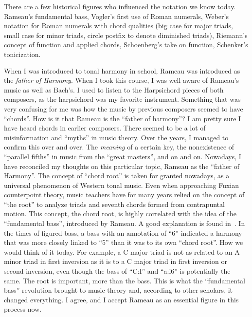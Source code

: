 There are a few historical figures who influenced the notation we know today.
Rameau's fundamental bass, Vogler's first use of Roman numerals, Weber's notation for Roman numerals with chord qualities (big case for major triads, small case for minor triads, circle postfix to denote diminished triads), Riemann's concept of function and applied chords, Schoenberg's take on function, Schenker's tonicization.

When I was introduced to tonal harmony in school, Rameau was introduced as the \emph{father of Harmony}.
When I took this course, I was well aware of Rameau's music as well as Bach's.
I used to listen to the Harpsichord pieces of both composers, as the harpsichord was my favorite instrument.
Something that was very confusing for me was how the music by previous composers seemed to have ``chords''.
How is it that Rameau is the ``father of harmony''? I am pretty sure I have heard chords in earlier composers.
There seemed to be a lot of misinformation and ``myths'' in music theory.
Over the years, I managed to confirm this over and over.
The \emph{meaning} of a certain key, the nonexistence of ``parallel fifths'' in music from the ``great masters'', and on and on.
Nowadays, I have reconciled my thoughts on this particular topic, Rameau as the ``father of Harmony''.
The concept of ``chord root'' is taken for granted nowadays, as a universal phenomenon of Western tonal music.
Even when approaching Fuxian counterpoint theory, music teachers have for many years relied on the concept of ``the root'' to analyze triads and seventh chords formed from contrapuntal motion.
This concept, the chord root, is highly correlated with the idea of the ``fundamental bass'', introduced by Rameau.
A good explanation is found in~\cite{christensen_rameau_2002}.
In the times of figured bass, a bass with an annotation of ``6'' indicated a harmony that was more closely linked to ``5'' than it was to its own ``chord root''.
How we would think of it today.
For example, a C major triad is not as related to an A minor triad in first inversion as it is to a C major triad in first inversion or second inversion, even though the bass of ``C:I'' and ``a:i6'' is potentially the same.
The root is important, more than the bass.
This is what the ``fundamental bass'' revolution brought to music theory and, according to other scholars, it changed everything.
I agree, and I accept Rameau as an essential figure in this process now.


